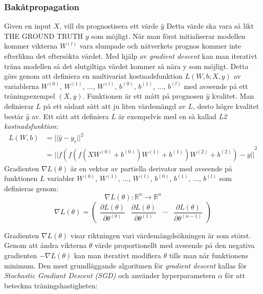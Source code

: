 \documentclass[a4paper,11pt,twoside]{article}
\newcommand*{\pd}[2]{\ensuremath{\dfrac{\partial #1}{\partial #2}}}
\begin{document}
\subsubsection{Bakåtpropagation}
Given en input $X$, vill du prognostisera ett värde $\hat{y}$ Detta värde ska vara så likt THE GROUND TRUTH $y$ som möjligt. När man först initialiserar modellen kommer vikterna $W^{(l)}$ vara slumpade och nätverkets prognos kommer inte efterlikna det eftersökta värdet. Med hjälp av \textit{gradient descent} kan man iterativt träna modellen så det slutgiltiga värdet kommer så nära y som möjligt. Detta görs genom att definiera en multivariat kostnadsfunktion $L(W, b; X,y)$ av variablerna $W^{(0)}$, $W^{(1)}$, ..., $W^{(l)}$, $b^{(0)}$, $b^{(1)}$, ..., $b^{(l)}$ med avseende på ett träningsexempel $(X, y)$. Funktionen är ett mått på prognosen $\hat{y}$ kvalitet. Man definierar $L$ på ett sådant sätt att ju liten värdemängd av $L$, desto högre kvalitet består $\hat{y}$ av. Ett sätt att definiera $L$ är exempelvis med en så kallad \textit{L2 kostnadsfunktion}: \cite{cs231n} \cite{wikiStanford}
\begin{equation}
\begin{split}
L(W,b) 	& = {||\hat{y}-y_r||}^2 \\
		& = {||f(f(f(XW^{(0)} +b^{(0)})W^{(1)} +b^{(1)})W^{(2)} +b^{(2)}) - y||}^2
\end{split}
\end{equation}
Gradienten $\nabla L(\theta)$ är en vektor av partiella derivator med avseende på funktionen $L$ variabler $W^{(0)}$, $W^{(1)}$, ..., $W^{(l)}$, $b^{(0)}$, $b^{(1)}$, ..., $b^{(l)}$ som definieras genom: \cite{gradient} \cite{convmath} 
\begin{equation}
\nabla L(\theta) : \mathbb{R}^n \to \mathbb{R}^n
\end{equation}
\begin{equation}
\nabla L(\theta) = 
	\begin{pmatrix} 
		\pd{L(\theta)}{\theta^{(0)}} & 
		\pd{L(\theta)}{\theta^{(1)}} &
		\cdots &
		\pd{L(\theta)}{\theta^{(n-1)}}
		
		\end{pmatrix}
\end{equation}

Gradienten $\nabla L(\theta)$ visar riktningen vari värdemängdsökningen är som störst. Genom att ändra vikterna $\theta$ värde proportionellt med avseende på den negativa gradienten $-\nabla L(\theta)$ kan man iterativt modifiera $\theta$ tills man når funktionens minimum. Den mest grundläggande algoritmen för \textit{gradient descent} kallas för \textit{Stochastic Gradiant Descent (SGD)} och använder hyperparametern $\alpha$ för att beteckna träningshastigheten: \cite{gradient} \cite{convmath} \cite{wikiStanford}
\end{document}
